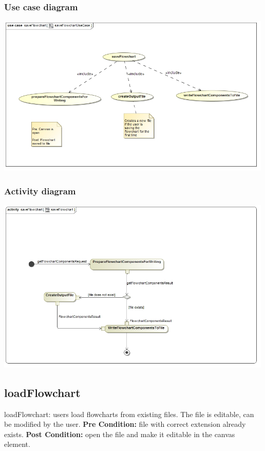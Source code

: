 \documentclass[11pt,a4paper,titlepage]{article}
\begin{document}
\subsubsection{Use case diagram}
\includegraphics[width=500px]{saveFlowchartUseCase.jpg}

\subsubsection{Activity diagram}
\includegraphics[width=500px]{saveFlowchart.jpg}

\subsection{loadFlowchart}
loadFlowchart: users load flowcharts from existing files. The file is editable, can be modified by the user.\newline\newline
\textbf{Pre Condition:} file with correct extension already exists.\newline
\textbf{Post Condition:} open the file and make it editable in the canvas element.
\end{document}

